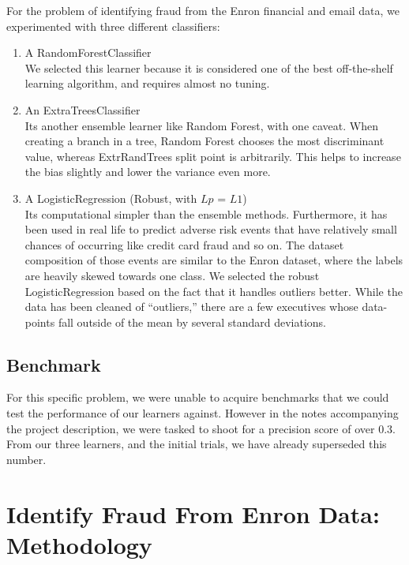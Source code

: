 \documentclass[twoside,openright,titlepage,numbers=noenddot,headinclude,%
               footinclude=true,cleardoublepage=empty,abstractoff,BCOR=5mm,%
               paper=a4,fontsize=11pt,ngerman,american]{scrreprt}
\numberwithin{theorem}{chapter}
\numberwithin{definition}{chapter}
\numberwithin{algorithm}{chapter}
\numberwithin{figure}{chapter}
\numberwithin{table}{chapter}
\numberwithin{equation}{chapter}
\begin{document}
For the problem of identifying fraud from the Enron financial and email data, we experimented with three different classifiers:
\begin{enumerate}%
\item A RandomForestClassifier\\
We selected this learner because it is considered one of the best off-the-shelf learning algorithm, and requires almost no tuning. 
\item An ExtraTreesClassifier\\
 Its another ensemble learner like Random Forest, with one caveat. When creating a branch in a tree, Random Forest chooses the most discriminant value, whereas ExtrRandTrees split point is arbitrarily. This helps to increase the bias slightly and lower the variance even more.
\item A LogisticRegression (Robust, with $Lp$ = $L1$) \\
Its computational simpler than the ensemble methods. Furthermore, it has been used in real life to predict adverse risk events that have relatively small chances of occurring like credit card fraud and so on. The dataset composition of those events are similar to the Enron dataset, where the labels are heavily skewed towards one class.
We selected the robust LogisticRegression based on the fact that it handles outliers better. While the data has been cleaned of ``outliers,'' there are a few executives whose data-points fall outside of the mean by several standard deviations.
\end{enumerate}



\section*{Benchmark}

For this specific problem, we were unable to acquire benchmarks that we could test the performance of our learners against. However in the notes accompanying the project description, we were tasked to shoot for a precision score of over 0.3. From our three learners, and the initial trials, we have already superseded this number.


\chapter*{Identify Fraud From Enron Data: Methodology}
\end{document}
